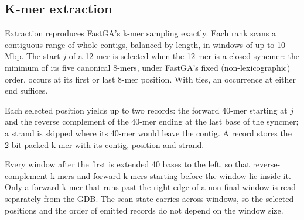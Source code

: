 \subsection{K-mer extraction}\label{sec:alg:extraction}

Extraction reproduces FastGA's k-mer sampling exactly. Each rank scans a
contiguous range of whole contigs, balanced by length, in windows of up to
10\,Mbp. The start $j$ of a 12-mer is selected when the 12-mer is a closed
syncmer: the minimum of its five canonical 8-mers, under FastGA's fixed
(non-lexicographic) order, occurs at its first or last 8-mer position.
With ties, an occurrence at either end suffices.

Each selected position yields up to two records: the forward 40-mer
starting at $j$ and the reverse complement of the 40-mer ending at the last
base of the syncmer; a strand is skipped where its 40-mer would leave the
contig. A record stores the 2-bit packed k-mer with its contig, position
and strand.

Every window after the first is extended 40 bases to the left, so that
reverse-complement k-mers and forward k-mers starting before the window
lie inside it. Only a forward k-mer that runs past the right edge of a
non-final window is read separately from the GDB. The scan state carries
across windows, so the selected positions and the order of emitted records
do not depend on the window size.
